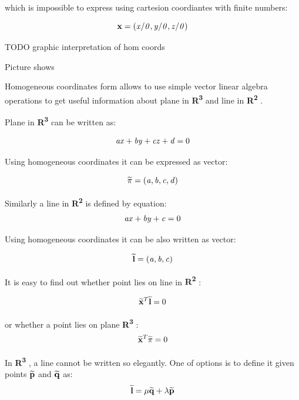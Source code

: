 \documentclass[a4paper,12pt]{article}
\newcommand{\evect}[1]{
{\bf #1}
}
\newcommand{\ehvect}[1]{
{\bf \widetilde{#1}}
}
\newcommand{\escal}[1]{
{\it #1}
}
\newcommand{\eucl}[1]{
{\bf R\textsuperscript{#1}}
}
\begin{document}
which is impossible to express using cartesion coordiantes with finite numbers:

\begin{equation}
\evect{x} = (\escal{x} / \escal{0}, \escal{y} / \escal{0}, \escal{z} / \escal{0})
\end{equation}

TODO graphic interpretation of hom coords 

Picture shows 


Homogeneous coordinates form allows to 
use simple vector linear algebra operations 
to get useful information about plane in \eucl{3} and line in \eucl{2}.

Plane in \eucl{3} can be written as:

\begin{equation}
\escal{a}\escal{x} + \escal{b}\escal{y} + \escal{c}\escal{z} + \escal{d} = 0
\end{equation}

Using homogeneous coordinates it can be expressed as vector:

\begin{equation}
\ehvect{\pi} =  (\escal{a}, \escal{b}, \escal{c}, \escal{d})
\end{equation}


Similarly a line in \eucl{2} is defined by equation:
\begin{equation}
\escal{a}\escal{x} + \escal{b}\escal{y} + \escal{c} = 0
\end{equation}

Using homogeneous coordinates it can be also written as vector:

\begin{equation}
\ehvect{l} =  (\escal{a}, \escal{b}, \escal{c})
\end{equation}

It is easy to find out whether point lies on line in \eucl{2}:

\begin{equation}
\ehvect{x}^{T} \ehvect{l} = 0
\end{equation}

or whether a point lies on plane \eucl{3}:
\begin{equation}
\ehvect{x}^{T} \ehvect{\pi} = 0
\end{equation}


In \eucl{3}, a line cannot be written so elegantly.
One of options is to define it given points $\ehvect{p}$ and $\ehvect{q}$ as:
\begin{equation}
 \ehvect{l} = \escal{\mu}\ehvect{q} + \escal{\lambda}\ehvect{p}
\end{equation}
\end{document}
